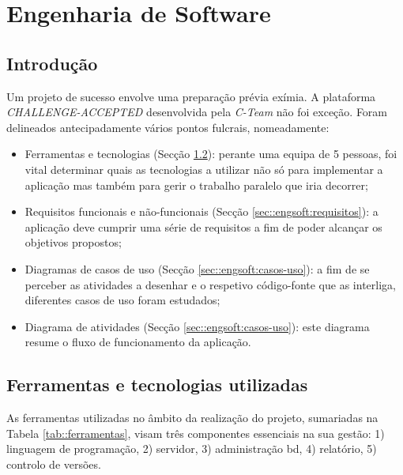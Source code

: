 \chapter{Engenharia de Software}
\label{ch::engsoft}


\section{Introdução}
\label{sec::engsoft:intro}
Um projeto de sucesso envolve uma preparação prévia exímia. A plataforma \emph{CHALLENGE-ACCEPTED} desenvolvida pela \emph{C-Team} não foi exceção. Foram delineados antecipadamente vários pontos fulcrais, nomeadamente:
\begin{itemize}
	\item Ferramentas e tecnologias (Secção \ref{sec::engsoft:tecnologia}): perante uma equipa de 5 pessoas, foi vital determinar quais as tecnologias a utilizar não só para implementar a aplicação mas também para gerir o trabalho paralelo que iria decorrer;
	\item Requisitos funcionais e não-funcionais (Secção \ref{sec::engsoft:requisitos}): a aplicação deve cumprir uma série de requisitos a fim de poder alcançar os objetivos propostos;
	\item Diagramas de casos de uso (Secção \ref{sec::engsoft:casos-uso}): a fim de se perceber as atividades a desenhar e o respetivo código-fonte que as interliga, diferentes casos de uso foram estudados;
	\item Diagrama de atividades (Secção \ref{sec::engsoft:casos-uso}): este diagrama resume o fluxo de funcionamento da aplicação.
\end{itemize}


\section{Ferramentas e tecnologias utilizadas}
\label{sec::engsoft:tecnologia}

As ferramentas utilizadas no âmbito da realização do projeto, sumariadas na Tabela \ref{tab::ferramentas}, visam três componentes essenciais na sua gestão: 1) linguagem de programação, 2) servidor, 3) administração bd, 4) relatório, 5) controlo de versões.


